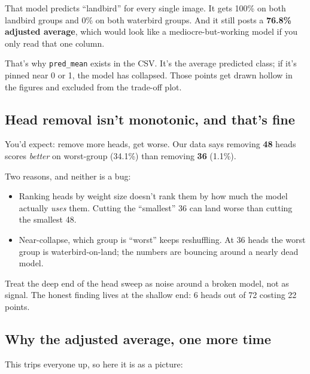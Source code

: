 \documentclass[11pt]{article}
\newcommand{\code}[1]{\texttt{\small #1}}
\begin{document}
\noindent That model predicts ``landbird'' for every single image. It gets 100\%
on both landbird groups and 0\% on both waterbird groups. And it still posts a
\textbf{76.8\% adjusted average}, which would look like a mediocre-but-working
model if you only read that one column.

That's why \code{pred\_mean} exists in the CSV. It's the average predicted class;
if it's pinned near 0 or 1, the model has collapsed. Those points get drawn
hollow in the figures and excluded from the trade-off plot.

\subsection{Head removal isn't monotonic, and that's fine}

You'd expect: remove more heads, get worse. Our data says removing \textbf{48}
heads scores \emph{better} on worst-group (34.1\%) than removing \textbf{36}
(1.1\%).

Two reasons, and neither is a bug:

\begin{itemize}[leftmargin=1.4em]
\item Ranking heads by weight size doesn't rank them by how much the model
actually \emph{uses} them. Cutting the ``smallest'' 36 can land worse than
cutting the smallest 48.
\item Near-collapse, which group is ``worst'' keeps reshuffling. At 36 heads the
worst group is waterbird-on-land; the numbers are bouncing around a nearly dead
model.
\end{itemize}

\noindent Treat the deep end of the head sweep as noise around a broken model,
not as signal. The honest finding lives at the shallow end: 6 heads out of 72
costing 22 points.

\subsection{Why the adjusted average, one more time}

This trips everyone up, so here it is as a picture:

\begin{center}
\end{center}
\end{document}
